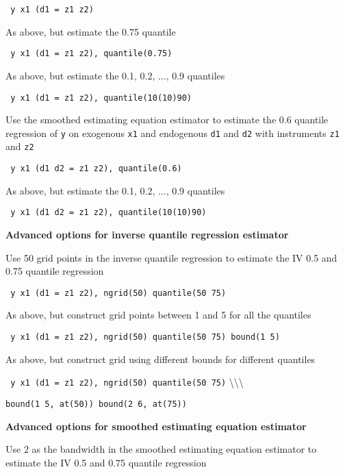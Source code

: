 \vskip 0.2cm
{\tt \ivqregiqr\ y x1 (d1 = z1 z2)}

\vskip 0.2cm 
\noindent
As above, but estimate the 0.75 quantile

\vskip 0.2cm 
{\tt \ivqregiqr\ y x1 (d1 = z1 z2), quantile(0.75)}

\vskip 0.2cm 
\noindent
As above, but estimate the 0.1, 0.2, ..., 0.9 quantiles

\vskip 0.2cm 
{\tt \ivqregiqr\ y x1 (d1 = z1 z2), quantile(10(10)90)}

\vskip 0.2cm
\noindent
Use the smoothed estimating equation estimator to estimate the 0.6 quantile
regression of {\tt y} on exogenous {\tt x1} and endogenous {\tt d1} and {\tt d2}
with instruments {\tt z1} and {\tt z2}

\vskip 0.2cm 
{\tt \ivqregsee\ y x1 (d1 d2 = z1 z2), quantile(0.6)}

\vskip 0.2cm
\noindent
As above, but estimate the 0.1, 0.2, ..., 0.9 quantiles

\vskip 0.2cm 
{\tt \ivqregsee\ y x1 (d1 d2 = z1 z2), quantile(10(10)90)}

\vskip 0.5cm

\noindent
{\bf Advanced options for inverse quantile regression estimator}
\vskip 0.2cm

\vskip 0.2cm
\noindent
Use 50 grid points in the inverse quantile regression to estimate the IV 0.5 and
0.75 quantile regression

\vskip 0.2cm 
{\tt \ivqregiqr\ y x1 (d1 = z1 z2), ngrid(50) quantile(50 75)}

\vskip 0.2cm
\noindent
As above, but construct grid points between 1 and 5 for all the quantiles

\vskip 0.2cm 
{\tt \ivqregiqr\ y x1 (d1 = z1 z2), ngrid(50) quantile(50 75) bound(1 5)}

\vskip 0.2cm
\noindent
As above, but construct grid using different bounds for different quantiles

\vskip 0.2cm 
{\tt \ivqregiqr\ y x1 (d1 = z1 z2), ngrid(50) quantile(50 75)}  
\hskip 2cm
\textbackslash\textbackslash\textbackslash

\hskip 3cm  {\tt bound(1 5, at(50)) bound(2 6, at(75))}

\vskip 0.5cm
\noindent
{\bf Advanced options for smoothed estimating equation estimator}

\vskip 0.2cm
\noindent
Use $2$ as the bandwidth in the smoothed estimating equation estimator to
estimate the IV 0.5 and 0.75 quantile regression

